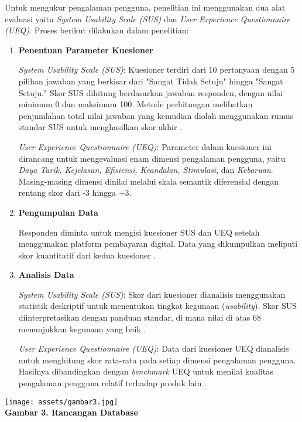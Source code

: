 \documentclass[
 manuscript=article,  %
  layout=publish, 
  year=2024, 
  month= Februari, %
  volume=8,
  number=1 
]{JIKO}
\begin{document}
\noindent\hspace{1cm}Untuk mengukur pengalaman pengguna, penelitian ini menggunakan dua alat evaluasi yaitu \textit{System Usability Scale (SUS)} dan \textit{User Experience Questionnaire (UEQ)}. Proses berikut dilakukan dalam penelitian:

\begin{enumerate}[leftmargin=2em]
    \item \textbf{Penentuan Parameter Kuesioner}

    \noindent\hspace{1cm}\textit{System Usability Scale (SUS)}: Kuesioner terdiri dari 10 pertanyaan dengan 5 pilihan jawaban yang berkisar dari "Sangat Tidak Setuju" hingga "Sangat Setuju." Skor SUS dihitung berdasarkan jawaban responden, dengan nilai minimum 0 dan maksimum 100. Metode perhitungan melibatkan penjumlahan total nilai jawaban yang kemudian diolah menggunakan rumus standar SUS untuk menghasilkan skor akhir \cite{11}.

    \noindent\hspace{1cm}\textit{User Experience Questionnaire (UEQ)}: Parameter dalam kuesioner ini dirancang untuk mengevaluasi enam dimensi pengalaman pengguna, yaitu \textit{Daya Tarik, Kejelasan, Efisiensi, Keandalan, Stimulasi}, dan \textit{Kebaruan}. Masing-masing dimensi dinilai melalui skala semantik diferensial dengan rentang skor dari -3 hingga +3.

    \item \textbf{Pengumpulan Data}

    \noindent\hspace{1cm}Responden diminta untuk mengisi kuesioner SUS dan UEQ setelah menggunakan platform pembayaran digital. Data yang dikumpulkan meliputi skor kuantitatif dari kedua kuesioner \cite{12}.

    \item \textbf{Analisis Data}

    \noindent\hspace{1cm}\textit{System Usability Scale (SUS)}: Skor dari kuesioner dianalisis menggunakan statistik deskriptif untuk menentukan tingkat kegunaan (\textit{usability}). Skor SUS diinterpretasikan dengan panduan standar, di mana nilai di atas 68 menunjukkan kegunaan yang baik \cite{14}.

    \noindent\hspace{1cm}\textit{User Experience Questionnaire (UEQ)}: Data dari kuesioner UEQ dianalisis untuk menghitung skor rata-rata pada setiap dimensi pengalaman pengguna. Hasilnya dibandingkan dengan \textit{benchmark} UEQ untuk menilai kualitas pengalaman pengguna relatif terhadap produk lain \cite{15}.
\end{enumerate}
\begin{center}
    \texttt{[image: assets/gambar3.jpg]}
    \\\textbf{Gambar 3. Rancangan Database}
\end{center}
\end{document}

